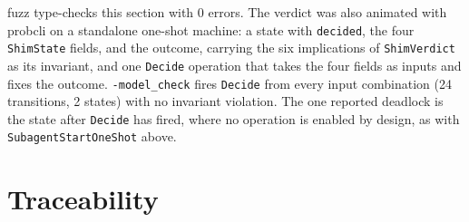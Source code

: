 \documentclass[a4paper,10pt,fleqn]{article}
\newcommand{\field}[1]{\texttt{#1}}
\begin{document}
fuzz type-checks this section with 0 errors. The verdict was also
animated with probcli on a standalone one-shot machine: a state with
\field{decided}, the four \field{ShimState} fields, and the outcome,
carrying the six implications of \field{ShimVerdict} as its invariant,
and one \field{Decide} operation that takes the four fields as inputs
and fixes the outcome. \texttt{-model\_check} fires \field{Decide} from
every input combination (24 transitions, 2 states) with no invariant
violation. The one reported deadlock is the state after \field{Decide}
has fired, where no operation is enabled by design, as with
\field{SubagentStartOneShot} above.

\section{Traceability}
\label{sec:trace}
\end{document}
